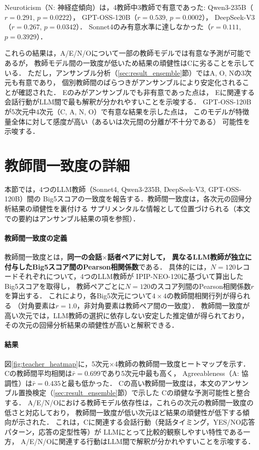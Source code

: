 \documentclass[dvipdfmx,11pt,a4paper]{bxjsarticle}
\begin{document}
Neuroticism（N: 神経症傾向）は，4教師中3教師で有意であった:
Qwen3-235B（$r = 0.291$, $p = 0.0222$），
GPT-OSS-120B（$r = 0.539$, $p = 0.0002$），
DeepSeek-V3（$r = 0.267$, $p = 0.0342$）．
Sonnet4のみ有意水準に達しなかった（$r = 0.111$, $p = 0.3929$）．

これらの結果は，A/E/N/Oについて一部の教師モデルでは有意な予測が可能であるが，
教師モデル間の一致度が低いため結果の頑健性はCに劣ることを示している．
ただし，アンサンブル分析（\ref{sec:result_ensemble}節）ではA, O, Nの3次元も有意であり，
個別教師間のばらつきがアンサンブルにより安定化されることが確認された．
Eのみがアンサンブルでも非有意であった点は，
Eに関連する会話行動がLLM間で最も解釈が分かれやすいことを示唆する．
GPT-OSS-120Bが5次元中4次元（C, A, N, O）で有意な結果を示した点は，
このモデルが特徴量全体に対して感度が高い（あるいは次元間の分離が不十分である）
可能性を示唆する．

\section{教師間一致度の詳細}
\label{sec:appendix_teacher_agreement}
本節では，4つのLLM教師（Sonnet4, Qwen3-235B, DeepSeek-V3, GPT-OSS-120B）間の
Big5スコアの一致度を報告する．教師間一致度は，各次元の回帰分析結果の頑健性を裏付ける
サプリメンタルな情報として位置づけられる（本文での要約はアンサンブル結果の項を参照）．

\paragraph{教師間一致度の定義}
教師間一致度とは，\textbf{同一の会話$\times$話者ペアに対して，
異なるLLM教師が独立に付与したBig5スコア間のPearson相関係数}である．
具体的には，$N = 120$レコードそれぞれについて，4つのLLM教師が
IPIP-NEO-120に基づいて算出したBig5スコアを取得し，
教師ペアごとに$N = 120$のスコア列間のPearson相関係数$r$を算出する．
これにより，各Big5次元について$4 \times 4$の教師間相関行列が得られる
（対角要素は$r = 1.0$，非対角要素は教師ペア間の一致度）．
教師間一致度が高い次元では，LLM教師の選択に依存しない安定した推定値が得られており，
その次元の回帰分析結果の頑健性が高いと解釈できる．

\paragraph{結果}
図\ref{fig:teacher_heatmap}に，5次元$\times$4教師の教師間一致度ヒートマップを示す．
Cの教師間平均相関は$\bar{r} = 0.699$であり5次元中最も高く，
Agreeableness（A: 協調性）は$\bar{r} = 0.435$と最も低かった．
Cの高い教師間一致度は，本文のアンサンブル置換検定（\ref{sec:result_ensemble}節）で示した
Cの頑健な予測可能性と整合する．
A/E/N/Oにおける教師モデル依存性は，これらの次元の教師間一致度の低さと対応しており，
教師間一致度が低い次元ほど結果の頑健性が低下する傾向が示された．
これは，Cに関連する会話行動（発話タイミング，YES/NO応答パターン，応答の定型性等）が
LLMにとって比較的観察しやすい特性である一方，
A/E/N/Oに関連する行動はLLM間で解釈が分かれやすいことを示唆する．
\end{document}
